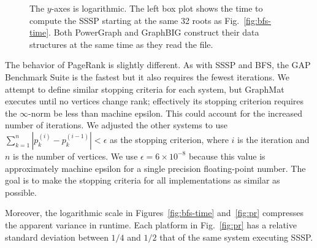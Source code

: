 \documentclass{llncs}
\begin{document}
\begin{figure}
\begin{minipage}{0.365\linewidth}
	\end{minipage}
	\caption{The $y$-axes is logarithmic. The left box plot shows the time to compute the SSSP starting at the same 32 roots as Fig.~\ref{fig:bfs-time}. Both PowerGraph and GraphBIG construct their data structures at the same time as they read the file.}
	\label{fig:sssp-time}
\end{figure}

The behavior of PageRank is slightly different. As with SSSP and BFS, the GAP Benchmark Suite is the fastest but it also requires the fewest iterations. We attempt to define similar stopping criteria for each system, but GraphMat executes until no vertices change rank; effectively its stopping criterion requires the $\infty$-norm be less than machine epsilon. This could account for the increased number of iterations. We adjusted the other systems to use $\sum_{k=1}^{n} |p_k^{(i)} - p_k^{(i-1)}| < \epsilon $ as the stopping criterion, where $i$ is the iteration and $n$ is the number of vertices. We use $\epsilon = 6 \times 10^{-8}$ because this value is approximately machine epsilon for a single precision floating-point number. The goal is to make the stopping criteria for all implementations as similar as possible.

Moreover, the logarithmic scale in Figures~\ref{fig:bfs-time} and~\ref{fig:pr} compresses the apparent variance in runtime. Each platform in Fig.~\ref{fig:pr} has a relative standard deviation between $1/4$ and $1/2$ that of the same system executing SSSP.
\end{document}
